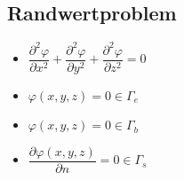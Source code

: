 \subsection{Randwertproblem}
\begin{multicols}{2}
\begin{itemize}
	\item $\dfrac{\partial^2\varphi}{\partial x^2} +  \dfrac{\partial^2\varphi}{\partial y^2} + \dfrac{\partial^2\varphi}{\partial z^2}=0 $
	\item $\varphi(x,y,z)=0 \in \Gamma_e$
	\item $\varphi(x,y,z)=0 \in \Gamma_b$
	\item $ \dfrac{\partial\varphi(x,y,z)}{\partial n} = 0 \in \Gamma_s$
\end{itemize}
\end{multicols}

%
%
%
\clearpage
\pagebreak
